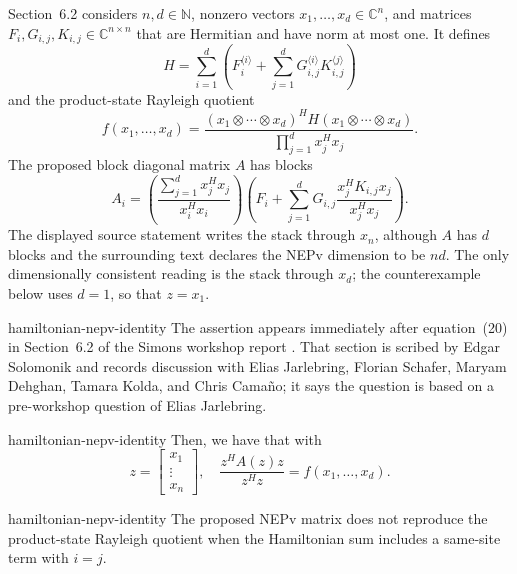 
\begin{cxcredits}
\end{cxcredits}

\begin{cxcontext}
Section~6.2 considers $n,d\in\mathbb N$, nonzero vectors
$x_1,\ldots,x_d\in\mathbb C^n$, and matrices
$F_i,G_{i,j},K_{i,j}\in\mathbb C^{n\times n}$ that are Hermitian and have
norm at most one.  It defines
\[
H=\sum_{i=1}^{d}\left(F_i^{\langle i\rangle}
 +\sum_{j=1}^{d}G_{i,j}^{\langle i\rangle}
 K_{i,j}^{\langle j\rangle}\right)
\]
and the product-state Rayleigh quotient
\[
f(x_1,\ldots,x_d)=
\frac{(x_1\otimes\cdots\otimes x_d)^H
H(x_1\otimes\cdots\otimes x_d)}
{\prod_{j=1}^{d}x_j^Hx_j}.
\]
The proposed block diagonal matrix $A$ has blocks
\[
A_i=\left(\frac{\sum_{j=1}^{d}x_j^Hx_j}{x_i^Hx_i}\right)
\left(F_i+\sum_{j=1}^{d}G_{i,j}
\frac{x_j^HK_{i,j}x_j}{x_j^Hx_j}\right).
\]
The displayed source statement writes the stack through $x_n$, although $A$
has $d$ blocks and the surrounding text declares the NEPv dimension to be
$nd$.  The only dimensionally consistent reading is the stack through $x_d$;
the counterexample below uses $d=1$, so that $z=x_1$.
\end{cxcontext}

\begin{cxsource}{hamiltonian-nepv-identity}
The assertion appears immediately after equation~(20) in Section~6.2 of the
Simons workshop report \cite{AmselEtAl2026}.  That section is
scribed by Edgar Solomonik and records
discussion with Elias Jarlebring, Florian Schafer, Maryam Dehghan, Tamara
Kolda, and Chris Cama\~no; it says the question is based on a pre-workshop
question of Elias Jarlebring.
\end{cxsource}

\begin{cxstatement}{hamiltonian-nepv-identity}
Then, we have that with
\[
z=\begin{bmatrix}x_{1}\\
\vdots\\
x_{n}\end{bmatrix},\quad
\frac{z^{H}A(z)z}{z^{H}z}=f(x_{1},\ldots,x_{d}).
\]
\end{cxstatement}

\begin{cxsummary}{hamiltonian-nepv-identity}
The proposed NEPv matrix does not reproduce the product-state Rayleigh
quotient when the Hamiltonian sum includes a same-site term with $i=j$.
\end{cxsummary}

